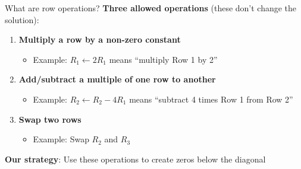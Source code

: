 \documentclass[aspectratio=169, lualatex, handout]{beamer}
\begin{document}
\begin{frame}{What are row operations?}
	\textbf{Three allowed operations} (these don't change the solution):
	\begin{enumerate}
		\item \textbf{Multiply a row by a non-zero constant}
		      \begin{itemize}
			      \item Example: $R_1 \leftarrow 2R_1$ means ``multiply Row 1 by 2''
		      \end{itemize}
		\item \textbf{Add/subtract a multiple of one row to another}
		      \begin{itemize}
			      \item Example: $R_2 \leftarrow R_2 - 4R_1$ means ``subtract 4 times Row 1 from Row 2''
		      \end{itemize}
		\item \textbf{Swap two rows}
		      \begin{itemize}
			      \item Example: Swap $R_2$ and $R_3$
		      \end{itemize}
	\end{enumerate}
	\textbf{Our strategy}: Use these operations to create zeros below the diagonal
\end{frame}
\end{document}
